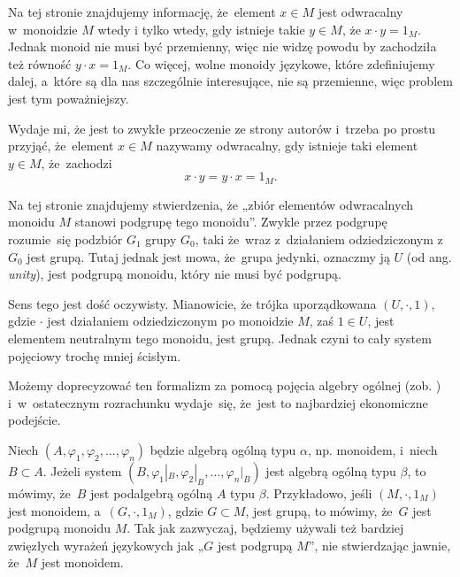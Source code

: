 \documentclass[a4paper,11pt]{article}
\begin{document}
\vspace{\spaceFour}



\start {} Na tej stronie znajdujemy informację, że~element
$x \in M$ jest odwracalny w~monoidzie $M$ wtedy i tylko wtedy, gdy
istnieje takie $y \in M$, że $x \cdot y = 1_{ M }$. Jednak monoid nie
musi być przemienny, więc nie widzę powodu by zachodziła też równość
$y \cdot x = 1_{ M }$. Co więcej, wolne monoidy językowe, które
zdefiniujemy dalej, a~które są dla nas szczególnie interesujące, nie
są przemienne, więc problem jest tym poważniejszy.

Wydaje mi, że jest to zwykłe przeoczenie ze strony autorów i~trzeba po
prostu przyjąć, że~element $x \in M$ nazywamy odwracalny, gdy istnieje
taki element $y \in M$, że~zachodzi
\begin{equation}
  \label{eq:Forys-Forys-01}
  x \cdot y = y \cdot x = 1_{ M }.
\end{equation}

\vspace{\spaceFour}



\start {} Na tej stronie znajdujemy stwierdzenia, że „zbiór
elementów odwracalnych monoidu $M$ stanowi podgrupę tego monoidu”.
Zwykle przez podgrupę rozumie~się podzbiór $G_{ 1 }$ grupy $G_{ 0 }$,
taki że~wraz z~działaniem odziedziczonym z~$G_{ 0 }$ jest grupą. Tutaj
jednak jest mowa, że~grupa jedynki, oznaczmy ją $U$ (od ang.
\textit{unity}), jest podgrupą monoidu, który nie musi być podgrupą.

Sens tego jest dość oczywisty. Mianowicie, że trójka uporządkowana
$( U, \cdot, 1 )$, gdzie $\cdot$ jest działaniem odziedziczonym po
monoidzie $M$, zaś $1 \in U$, jest elementem neutralnym tego monoidu,
jest grupą. Jednak czyni to cały system pojęciowy trochę mniej
ścisłym.

Możemy doprecyzować ten formalizm za pomocą pojęcia algebry
ogólnej (zob. \cite{BialynickiBirulaZarysAlgebry1987}) i~w~ostatecznym
rozrachunku wydaje~się, że~jest to najbardziej ekonomiczne podejście.

Niech $( A, \varphi_{ 1 }, \varphi_{ 2 }, \ldots, \varphi_{ n } )$ będzie algebrą ogólną typu $\alpha$, np.
monoidem, i~niech $B \subset A$. Jeżeli system
$( B, \varphi_{ 1 }|_{ B }, \varphi_{ 2 }|_{ B }, \ldots, \varphi_{ n }|_{ B } )$ jest algebrą ogólną
typu $\beta$, to mówimy, że~$B$ jest podalgebrą ogólną $A$ typu $\beta$.
Przykładowo, jeśli $( M, \cdot, 1_{ M } )$ jest monoidem, a~$( G, \cdot, 1_{ M } )$,
gdzie $G \subset M$, jest grupą, to mówimy, że~$G$ jest podgrupą monoidu $M$. Tak
jak zazwyczaj, będziemy używali też bardziej zwięzłych wyrażeń językowych
jak „$G$ jest podgrupą $M$”, nie stwierdzając jawnie, że~$M$ jest monoidem.
\end{document}
